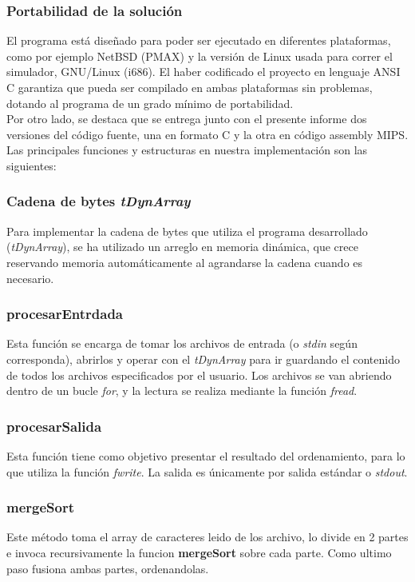 \documentclass[a4paper,10pt]{article}
\begin{document}
\subsubsection{Portabilidad de la soluci\'on}
El programa est\'a dise\~nado para poder ser ejecutado en diferentes plataformas, como por ejemplo NetBSD (PMAX) y la versi\'on de Linux usada para correr el simulador, GNU/Linux (i686). El haber codificado el proyecto en lenguaje ANSI C garantiza que pueda ser compilado en ambas plataformas sin problemas, dotando al programa de un grado m\'inimo de portabilidad.\\
Por otro lado, se destaca que se entrega junto con el presente informe dos versiones del c\'odigo fuente, una en formato C y la otra en c\'odigo assembly MIPS.\\

Las principales funciones y estructuras en nuestra implementaci\'on son las siguientes:

\subsubsection{Cadena de bytes \textit{tDynArray}}
Para implementar la cadena de bytes que utiliza el programa desarrollado (\textit{tDynArray}), se ha utilizado un arreglo en memoria din\'amica, que crece reservando memoria autom\'aticamente al agrandarse la cadena cuando es necesario.

\subsubsection{procesarEntrdada}
Esta funci\'on se encarga de tomar los archivos de entrada (o \textit{stdin} seg\'un corresponda), abrirlos y operar con el \textit{tDynArray} para ir guardando el contenido de todos los archivos especificados por el usuario. Los archivos se van abriendo dentro de un bucle \textit{for}, y la lectura se realiza mediante la funci\'on \textit{fread}.

\subsubsection{procesarSalida}
Esta funci\'on tiene como objetivo presentar el resultado del ordenamiento, para lo que utiliza la funci\'on \textit{fwrite}. La salida es \'unicamente por salida est\'andar o \textit{stdout}.

\subsubsection{mergeSort}
Este m\'etodo toma el array de caracteres leido de los archivo, lo divide en 2 partes e invoca recursivamente la funcion \textbf{mergeSort} sobre cada parte. Como ultimo paso fusiona ambas partes, ordenandolas.
\end{document}
